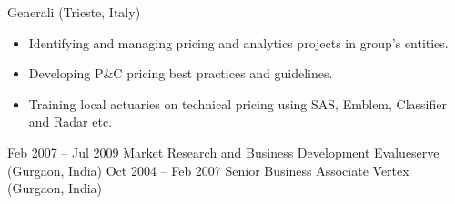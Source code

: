 \documentclass[a4paper,]{fortysecondscv}
\begin{document}
\begin{cvtable}
    {Generali (Trieste, Italy)}
    {
        \vspace{-\topsep}
        \begin{itemize}[nosep, leftmargin=0pt] %
            \item Identifying and managing pricing and analytics projects in group's entities.
            \item Developing P\&C pricing best practices and guidelines.
            \item Training local actuaries on technical pricing using SAS, Emblem, Classifier and Radar etc.
        \end{itemize}
    }
    \vspace{\topsep}
    \cvitem
    {Feb 2007 -- Jul 2009}
    {Market Research and Business Development}
    {Evalueserve (Gurgaon, India)}
    {
    }
    \vspace{\topsep}
    \cvitem
    {Oct 2004 -- Feb 2007}
    {Senior Business Associate}
    {Vertex (Gurgaon, India)}
    {
    }
\end{cvtable}





\newpage
\makebacksidebar

\end{document}
